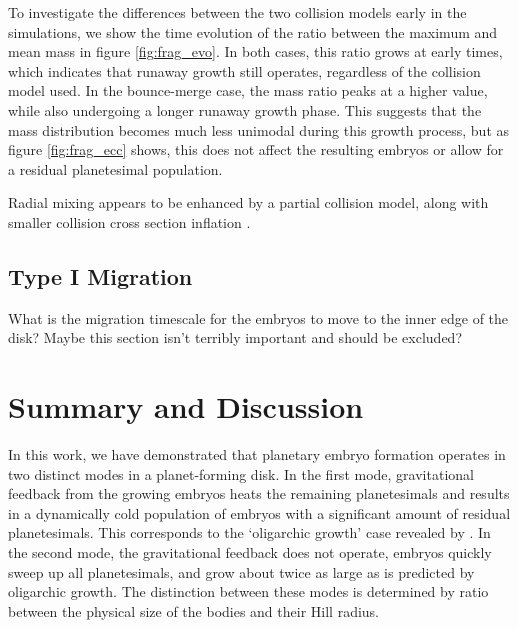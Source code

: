 \documentclass[twocolumn]{aastex63}
\begin{document}
To investigate the differences between the two collision models early in the simulations, we show the time evolution of the ratio between the maximum and mean mass in figure \ref{fig:frag_evo}. In both cases, this ratio grows at early times, which indicates that runaway growth still operates, regardless of the collision model used. In the bounce-merge case, the mass ratio peaks at a higher value, while also undergoing a longer runaway growth phase. This suggests that the mass distribution becomes much less unimodal during this growth process, but as figure \ref{fig:frag_ecc} shows, this does not affect the resulting embryos or allow for a residual planetesimal population.

Radial mixing appears to be enhanced by a partial collision model, along with smaller collision cross section inflation \citep{childs22}.


\subsection{Type I Migration}

What is the migration timescale for the embryos to move to the inner edge of the disk? Maybe this section isn't terribly important and should be excluded?

\section{Summary and Discussion} \label{sec:discuss}

In this work, we have demonstrated that planetary embryo formation operates in two distinct modes in a planet-forming disk. In the first mode, gravitational feedback from the growing embryos heats the remaining planetesimals and results in a dynamically cold population of embryos with a significant amount of residual planetesimals. This corresponds to the `oligarchic growth' case revealed by \citep{kokubo98}. In the second mode, the gravitational feedback does not operate, embryos quickly sweep up all planetesimals, and grow about twice as large as is predicted by oligarchic growth. The distinction between these modes is determined by ratio between the physical size of the bodies and their Hill radius. 
\end{document}

